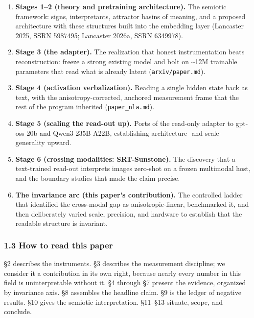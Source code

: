 \documentclass[
  11pt,
]{article}
\providecommand{\tightlist}{%
  \setlength{\itemsep}{0pt}\setlength{\parskip}{0pt}}
\begin{document}
\begin{enumerate}
\def\labelenumi{\arabic{enumi}.}
\tightlist
\item
  \textbf{Stages 1--2 (theory and pretraining architecture).} The
  semiotic framework: signs, interpretants, attractor basins of meaning,
  and a proposed architecture with these structures built into the
  embedding layer (Lancaster 2025, SSRN 5987495; Lancaster 2026a, SSRN
  6349978).
\item
  \textbf{Stage 3 (the adapter).} The realization that honest
  instrumentation beats reconstruction: freeze a strong existing model
  and bolt on \textasciitilde12M trainable parameters that read what is
  already latent (\texttt{arxiv/paper.md}).
\item
  \textbf{Stage 4 (activation verbalization).} Reading a single hidden
  state back as text, with the anisotropy-corrected, anchored
  measurement frame that the rest of the program inherited
  (\texttt{paper\_nla.md}).
\item
  \textbf{Stage 5 (scaling the read-out up).} Ports of the read-only
  adapter to gpt-oss-20b and Qwen3-235B-A22B, establishing architecture-
  and scale-generality upward.
\item
  \textbf{Stage 6 (crossing modalities: SRT-Sunstone).} The discovery
  that a text-trained read-out interprets images zero-shot on a frozen
  multimodal host, and the boundary studies that made the claim precise.
\item
  \textbf{The invariance arc (this paper's contribution).} The
  controlled ladder that identified the cross-modal gap as
  anisotropic-linear, benchmarked it, and then deliberately varied
  scale, precision, and hardware to establish that the readable
  structure is invariant.
\end{enumerate}

\subsubsection{1.3 How to read this paper}\label{how-to-read-this-paper}

§2 describes the instruments. §3 describes the measurement discipline;
we consider it a contribution in its own right, because nearly every
number in this field is uninterpretable without it. §4 through §7
present the evidence, organized by invariance axis. §8 assembles the
headline claim. §9 is the ledger of negative results. §10 gives the
semiotic interpretation. §11--§13 situate, scope, and conclude.
\end{document}
